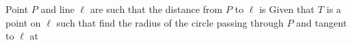 Point $P$ and line $\ell$ are such that the distance from $P$ to $\ell$ is  Given that $T$ is a point on $\ell$ such that  find the radius of the circle passing through $P$ and tangent to $\ell$ at 